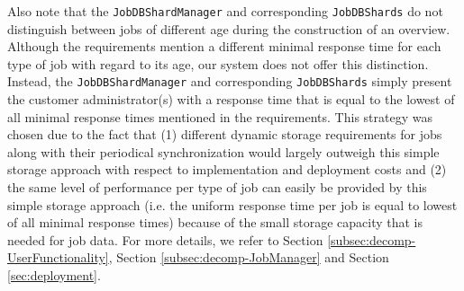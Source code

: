 \documentclass[a4paper,10pt]{article}
\begin{document}
Also note that the \texttt{JobDBShardManager} and corresponding \texttt{JobDBShards} do not distinguish between jobs of different age during the construction of an overview. Although the requirements mention a different minimal response time for each type of job with regard to its age, our system does not offer this distinction. Instead, the \texttt{JobDBShardManager} and corresponding \texttt{JobDBShards} simply present the customer administrator(s) with a response time that is equal to the lowest of all minimal response times mentioned in the requirements. This strategy was chosen due to the fact that (1) different dynamic storage requirements for jobs along with their periodical synchronization would largely outweigh this simple storage approach with respect to implementation and deployment costs and (2) the same level of performance per type of job can easily be provided by this simple storage approach (i.e. the uniform response time per job is equal to lowest of all minimal response times) because of the small storage capacity that is needed for job data.
For more details, we refer to Section \ref{subsec:decomp-UserFunctionality}, Section \ref{subsec:decomp-JobManager} and Section \ref{sec:deployment}.
\end{document}

